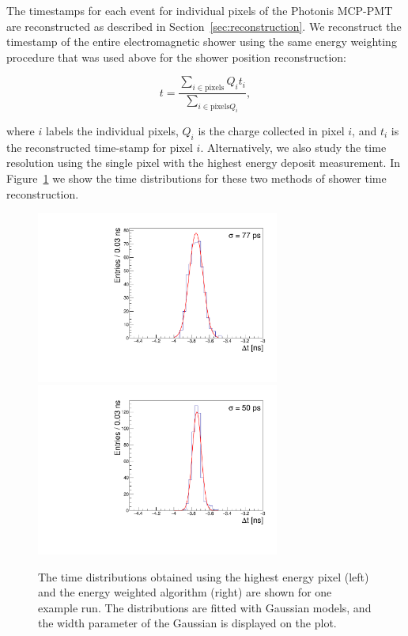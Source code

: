 \documentclass[12pt]{article}
\begin{document}
The timestamps for each event for individual pixels of the Photonis MCP-PMT are
reconstructed as described in Section~\ref{sec:reconstruction}. We reconstruct
the timestamp of the entire electromagnetic shower using the same energy
weighting procedure that was used above for the shower position reconstruction:

\begin{equation} t =\frac{\sum_{i\in\mathrm{pixels}} Q_{i} t_{i}}
{\sum_{i\in\mathrm{pixels} Q_{i}}}, 
\label{eqn:EnergyWeightedTimestamp}
\end{equation} 

where $i$ labels the individual pixels, $Q_{i}$ is the charge
collected in pixel $i$, and $t_{i}$ is the reconstructed time-stamp for pixel
$i$. Alternatively, we also study the time resolution using the single pixel
with the highest energy deposit measurement. In Figure~\ref{fig:exdt} we show
the time distributions for these two methods of shower time reconstruction.

\begin{figure}[htbp] 
\centering
\includegraphics[width=8cm]{Images/exdt/exdtHI.pdf}
\includegraphics[width=8cm]{Images/exdt/exdtWI.pdf} 
\caption{\small The time distributions obtained using the highest energy pixel (left) and the energy weighted algorithm (right) are shown for one example run. The distributions are
fitted with Gaussian models, and the width parameter of the Gaussian is
displayed on the plot.} 
\label{fig:exdt} 
\end{figure} 
\end{document}
